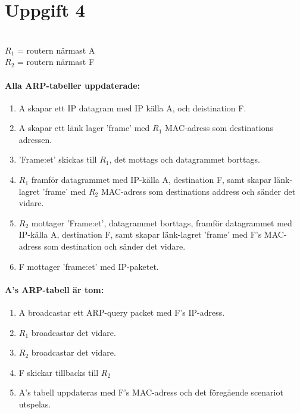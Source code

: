 \section{Uppgift 4}
\\ $R_1$ = routern närmast A
\\ $R_2$ = routern närmast F

\paragraph{Alla ARP-tabeller uppdaterade:}
\begin{enumerate}
    \item A skapar ett IP datagram med IP källa A, och deistination F.
    \item A skapar ett länk lager 'frame' med $R_1$ MAC-adress som destinations adressen.
    \item 'Frame:et' skickas till $R_1$, det mottags och datagrammet borttags.
    \item $R_1$ framför datagrammet med IP-källa A, destination F, samt skapar länk-lagret
	'frame' med $R_2$ MAC-adress som destinations address och sänder det vidare.
    \item $R_2$ mottager 'Frame:et', datagrammet borttags, framför datagrammet med IP-källa
	A, destination F, samt skapar länk-lagret 'frame' med F's MAC-adress som
	destination och sänder det vidare.
    \item F mottager 'frame:et' med IP-paketet.

\end{enumerate}
\paragraph{A's ARP-tabell är tom:}
\begin{enumerate}
    \item A broadcastar ett ARP-query packet med F's IP-adress.
    \item $R_1$ broadcastar det vidare.
    \item $R_2$ broadcastar det vidare.
    \item F skickar tillbacks till $R_2$ 
    \item A's tabell uppdateras med F's MAC-adress och det föregående scenariot utspelas.
\end{enumerate}
